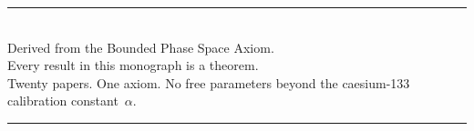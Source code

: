 \documentclass[12pt,a4paper,openany]{book}
\begin{document}
\clearpage
\thispagestyle{empty}
\vspace*{\fill}
\begin{center}
\rule{0.5\textwidth}{0.5pt}\\[1ex]
{\small Derived from the Bounded Phase Space Axiom.\\
Every result in this monograph is a theorem.\\
Twenty papers. One axiom. No free parameters beyond the caesium-133 calibration constant~$\alpha$.}\\[1ex]
\rule{0.5\textwidth}{0.5pt}
\end{center}
\vspace*{\fill}
\end{document}
